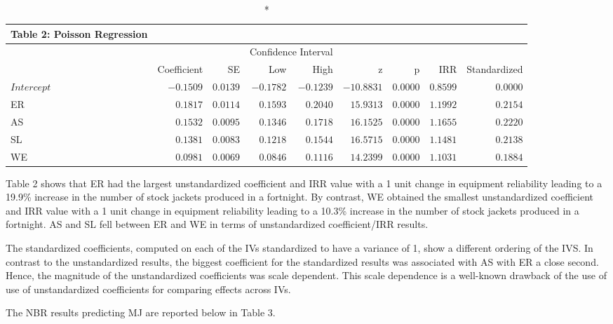 \documentclass[ShortAfour,times,sageapa]{sagej}
\begin{document}
	\begin{longtable}{l|rrrrrrrr}
		\caption*{
			{\large Table 2: Poisson Regression}
		} \\ 
		\toprule
		\multicolumn{1}{l}{} &  &  & \multicolumn{2}{c}{Confidence Interval} &  &  &  &  \\ 
		\cmidrule(lr){4-5}
		\multicolumn{1}{l}{} & Coefficient & SE & Low & High & z & p & IRR & Standardized \\ 
		\midrule
	\(Intercept\) & $-0.1509$ & $0.0139$ & $-0.1782$ & $-0.1239$ & $-10.8831$ & $0.0000$ & $0.8599$ & $0.0000$ \\ 
		ER & $0.1817$ & $0.0114$ & $0.1593$ & $0.2040$ & $15.9313$ & $0.0000$ & $1.1992$ & $0.2154$ \\ 
		AS & $0.1532$ & $0.0095$ & $0.1346$ & $0.1718$ & $16.1525$ & $0.0000$ & $1.1655$ & $0.2220$ \\ 
		SL & $0.1381$ & $0.0083$ & $0.1218$ & $0.1544$ & $16.5715$ & $0.0000$ & $1.1481$ & $0.2138$ \\ 
		WE & $0.0981$ & $0.0069$ & $0.0846$ & $0.1116$ & $14.2399$ & $0.0000$ & $1.1031$ & $0.1884$ \\ 
		\bottomrule
	\end{longtable}

	Table 2 shows that ER had the largest unstandardized coefficient and IRR value with a 1 unit change in equipment reliability leading to a 19.9\% increase in the number of stock jackets produced in a fortnight.
	By contrast, WE obtained the smallest unstandardized coefficient and IRR value with a 1 unit change in equipment reliability leading to a 10.3\% increase in the number of stock jackets produced in a fortnight. 
	AS and SL fell between ER and WE in terms of unstandardized coefficient/IRR results.
	
	The standardized coefficients, computed on each of the IVs standardized to have a variance of 1, show a different ordering of the IVS. 
	In contrast to the unstandardized results, the biggest coefficient for the standardized results was associated with AS with ER a close second. 
	Hence, the magnitude of the unstandardized coefficients was scale dependent.
	This scale dependence is a well-known drawback of the use of use of unstandardized coefficients for comparing effects across IVs.
	
	The NBR results predicting MJ are reported below in Table 3.
	
\end{document}

